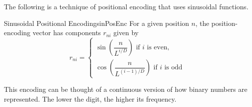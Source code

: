 \documentclass{article}
\begin{document}
        The following is a technique of positional encoding that uses sinusoidal functions.
        \begin{defn}{Sinusoidal Positional Encoding}{sinPosEnc}
            For a given position $n$, the position-encoding vector has components $r_{ni}$ given by
            \[
            r_{ni} = \begin{cases}
            \sin{\left(\dfrac{n}{L^{i/D}}\right)} \text{ if $i$ is even,}\\
            \cos{\left(\dfrac{n}{L^{(i-1)/D}}\right)} \text{ if $i$ is odd}
            \end{cases}
            \]
        \end{defn}
        This encoding can be thought of a continuous version of how binary numbers are represented.
        The lower the digit, the higher its frequency.
\end{document}
